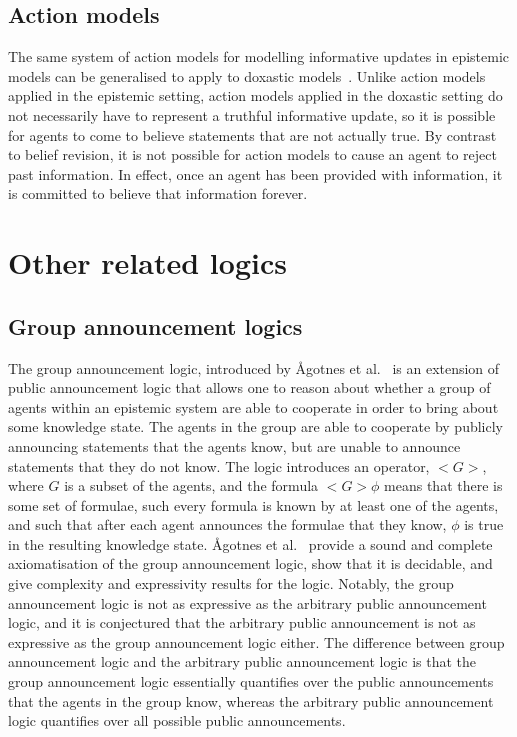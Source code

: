 \subsection{Action models}

The same system of action models for modelling informative updates in epistemic
models can be generalised to apply to doxastic
models~\cite{vanditmarsch2007dynamic}. Unlike action models applied in the
epistemic setting, action models applied in the doxastic setting do not
necessarily have to represent a truthful informative update, so it is possible
for agents to come to believe statements that are not actually true.  By
contrast to belief revision, it is not possible for action models to cause an
agent to reject past information. In effect, once an agent has been provided
with information, it is committed to believe that information forever.

\section{Other related logics}

\subsection{Group announcement logics}

The group announcement logic, introduced by {\AA}gotnes et
al.~\cite{agotnes2010group} is an extension of public announcement logic that
allows one to reason about whether a group of agents within an epistemic system
are able to cooperate in order to bring about some knowledge state. The agents
in the group are able to cooperate by publicly announcing statements that the
agents know, but are unable to announce statements that they do not know. The
logic introduces an operator, $<G>$, where $G$ is a subset of the agents, and
the formula $<G> \phi$ means that there is some set of formulae, such every
formula is known by at least one of the agents, and such that after each agent
announces the formulae that they know, $\phi$ is true in the resulting
knowledge state. {\AA}gotnes et al.~\cite{agotnes2010group} provide a sound and
complete axiomatisation of the group announcement logic, show that it is
decidable, and give complexity and expressivity results for the logic. Notably,
the group announcement logic is not as expressive as the arbitrary public
announcement logic, and it is conjectured that the arbitrary public
announcement is not as expressive as the group announcement logic either.  The
difference between group announcement logic and the arbitrary public
announcement logic is that the group announcement logic essentially quantifies
over the public announcements that the agents in the group know, whereas the
arbitrary public announcement logic quantifies over all possible public
announcements.


